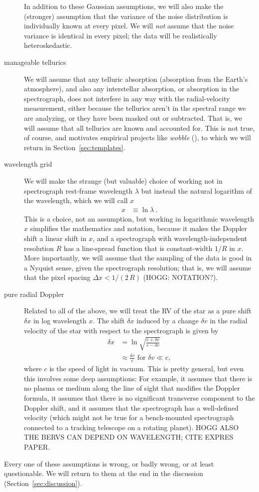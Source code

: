 \documentclass[modern]{aastex631}
\newcommand{\project}[1]{\textsl{#1}}
\newcommand{\wobble}{\project{wobble}}
\newcommand{\sectionname}{Section}
\newcommand{\secref}[1]{\sectionname~\ref{#1}}
\begin{document}
\begin{description}
    In addition to these Gaussian assumptions, we will also make the (stronger) assumption that the variance of the noise distribution is individually known at every pixel.
    We will \emph{not} assume that the noise variance is identical in every pixel; the data will be realistically heteroskedastic.
    \item[manageable tellurics]
    We will assume that any telluric absorption (absorption from the Earth's atmosphere), and also any interstellar absorption, or absorption in the spectrograph, does not interfere in any way with the radial-velocity measurement, either because the tellurics aren't in the spectral range we are analyzing, or they have been masked out or subtracted.
    That is, we will assume that all tellurics are known and accounted for.
    This is not true, of course, and motivates empirical projects like \wobble{} (\citealt{wobble}), to which we will return in \secref{sec:templates}.
    \item[wavelength grid] We will make the strange (but valuable) choice of working not in spectrograph rest-frame wavelength $\lambda$ but instead the natural logarithm of the wavelength, which we will call $x$
    \begin{align}
        x &\equiv \ln\lambda ~.
    \end{align}
    This is a choice, not an assumption, but working in logarithmic wavelength $x$ simplifies the mathematics and notation, because it makes the Doppler shift a linear shift in $x$, and a spectrograph with wavelength-independent resolution $R$ has a line-spread function that is constant-width $1/R$ in $x$.
    More importantly, we will assume that the sampling of the data is good in a Nyquist sense, given the spectrograph resolution; that is, we will assume that the pixel spacing $\Delta x<1/(2\,R)$ (HOGG: NOTATION?).
    \item[pure radial Doppler] Related to all of the above, we will treat the RV of the star as a pure shift $\delta x$ in log wavelength $x$.
    The shift $\delta x$ induced by a change $\delta v$ in the radial velocity of the star with respect to the spectrograph is given by
    \begin{align}
        \delta x &= \ln\sqrt{\frac{c + \delta v}{c - \delta v}}\\
        &\approx \frac{\delta v}{c} \mbox{~for~} \delta v \ll c,
    \end{align}
    where $c$ is the speed of light in vacuum.
    This is pretty general, but even this involves some deep assumptions:
    For example, it assumes that there is no plasma or medium along the line of sight that modifies the Doppler formula,
    it assumes that there is no significant transverse component to the Doppler shift,
    and it assumes that the spectrograph has a well-defined velocity (which might not be true for a bench-mounted spectrograph connected to a tracking telescope on a rotating planet). HOGG ALSO THE BERVS CAN DEPEND ON WAVELENGTH; CITE EXPRES PAPER.
\end{description}
Every one of these assumptions is wrong, or badly wrong, or at least questionable.
We will return to them at the end in the discussion (\secref{sec:discussion}).
\end{document}
